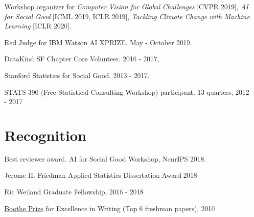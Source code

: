 \documentclass[letterpaper]{article}
\renewenvironment{itemize}{
  \begin{list}{}{
    \setlength{\leftmargin}{1.5em}
  }
}{
  \end{list}
}
\begin{document}
\begin{itemize}
\item Workshop organizer for \textit{Computer Vision for Global Challenges}
  [CVPR 2019], \textit{AI for Social Good} [ICML 2019, ICLR 2019],
  \textit{Tackling Climate Change with Machine Learning} [ICLR 2020].
\item Red Judge for IBM Watson AI XPRIZE. May - October 2019.
\item DataKind SF Chapter Core Volunteer. 2016 - 2017,
\item Stanford Statistics for Social Good. 2013 - 2017.
\item STATS 390 (Free Statistical Consulting Workshop) participant. 13 quarters, 2012 - 2017
\end{itemize}

\section*{Recognition}
\begin{itemize}
\item Best reviewer award. AI for Social Good Workshop, NeurIPS 2018.
\item Jerome H. Friedman Applied Statistics Dissertation Award 2018
\item Ric Weiland Graduate Fellowship, 2016 - 2018
\item \href{https://undergrad.stanford.edu/programs/pwr/publications-prizes-and-awards/boothe-prize-essays}{Boothe Prize} for Excellence in Writing (Top 6 freshman papers), 2010
\end{itemize}
\end{document}
